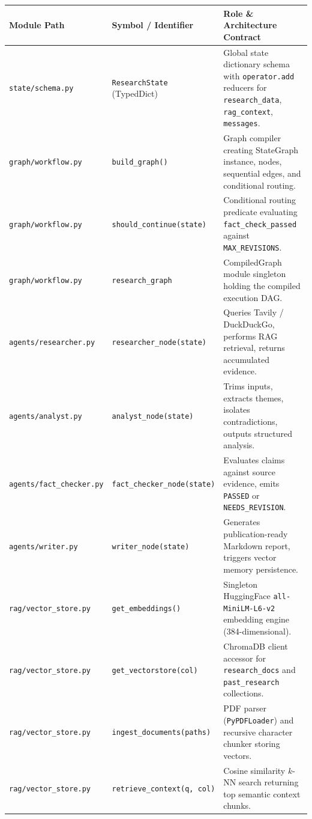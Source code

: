 \documentclass[11pt,a4paper,twoside]{report}
\begin{document}
\begin{center}
\begin{longtable}{|p{3.2cm}|p{4.5cm}|p{5.5cm}|}
\hline
\textbf{Module Path} & \textbf{Symbol / Identifier} & \textbf{Role \& Architecture Contract} \\
\hline
\endhead
\texttt{state/schema.py} & \texttt{ResearchState} (TypedDict) & Global state dictionary schema with \texttt{operator.add} reducers for \texttt{research\_data}, \texttt{rag\_context}, \texttt{messages}. \\
\hline
\texttt{graph/workflow.py} & \texttt{build\_graph()} & Graph compiler creating StateGraph instance, nodes, sequential edges, and conditional routing. \\
\hline
\texttt{graph/workflow.py} & \texttt{should\_continue(state)} & Conditional routing predicate evaluating \texttt{fact\_check\_passed} against \texttt{MAX\_REVISIONS}. \\
\hline
\texttt{graph/workflow.py} & \texttt{research\_graph} & CompiledGraph module singleton holding the compiled execution DAG. \\
\hline
\texttt{agents/researcher.py} & \texttt{researcher\_node(state)} & Queries Tavily / DuckDuckGo, performs RAG retrieval, returns accumulated evidence. \\
\hline
\texttt{agents/analyst.py} & \texttt{analyst\_node(state)} & Trims inputs, extracts themes, isolates contradictions, outputs structured analysis. \\
\hline
\texttt{agents/fact\_checker.py} & \texttt{fact\_checker\_node(state)} & Evaluates claims against source evidence, emits \texttt{PASSED} or \texttt{NEEDS\_REVISION}. \\
\hline
\texttt{agents/writer.py} & \texttt{writer\_node(state)} & Generates publication-ready Markdown report, triggers vector memory persistence. \\
\hline
\texttt{rag/vector\_store.py} & \texttt{get\_embeddings()} & Singleton HuggingFace \texttt{all-MiniLM-L6-v2} embedding engine (384-dimensional). \\
\hline
\texttt{rag/vector\_store.py} & \texttt{get\_vectorstore(col)} & ChromaDB client accessor for \texttt{research\_docs} and \texttt{past\_research} collections. \\
\hline
\texttt{rag/vector\_store.py} & \texttt{ingest\_documents(paths)} & PDF parser (\texttt{PyPDFLoader}) and recursive character chunker storing vectors. \\
\hline
\texttt{rag/vector\_store.py} & \texttt{retrieve\_context(q, col)} & Cosine similarity $k$-NN search returning top semantic context chunks. \\

\end{longtable}
\end{center}
\end{document}
